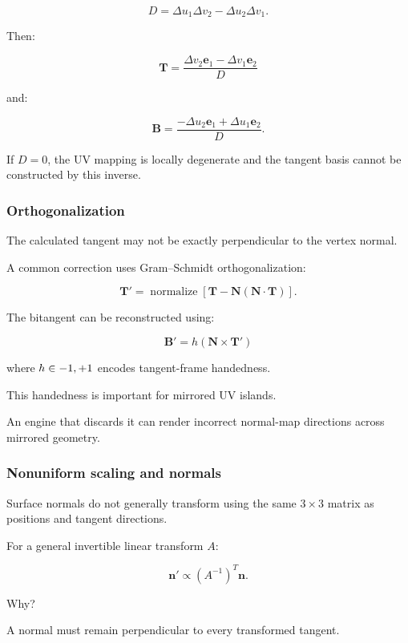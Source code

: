 \[
 D=\Delta u_1\Delta v_2-\Delta u_2\Delta v_1.
\]

Then:

\[
 \boxed{ \mathbf T= \frac{ \Delta v_2\mathbf e_1-\Delta v_1\mathbf e_2 }{D} }
\]

and:

\[
 \boxed{ \mathbf B= \frac{ -\Delta u_2\mathbf e_1+\Delta u_1\mathbf e_2 }{D} }.
\]

If \(D=0\), the UV mapping is locally degenerate and the tangent basis cannot be constructed by this inverse.

\subsubsection{Orthogonalization}\label{02-foundations-ii-ch032-orthogonalization}

The calculated tangent may not be exactly perpendicular to the vertex normal.

A common correction uses Gram--Schmidt orthogonalization:

\[
 \boxed{ \mathbf T'= \operatorname{normalize} \left[ \mathbf T-\mathbf N(\mathbf N\cdot\mathbf T) \right] }.
\]

The bitangent can be reconstructed using:

\[
 \boxed{ \mathbf B'=h(\mathbf N\times\mathbf T') }
\]

where \(h\in\\{-1,+1\\}\) encodes tangent-frame handedness.

This handedness is important for mirrored UV islands.

An engine that discards it can render incorrect normal-map directions across mirrored geometry.

\subsubsection{Nonuniform scaling and normals}\label{02-foundations-ii-ch032-nonuniform-scaling-and-normals}

Surface normals do not generally transform using the same \(3\times3\) matrix as positions and tangent directions.

For a general invertible linear transform \(A\):

\[
 \boxed{ \mathbf n'\propto(A^{-1})^T\mathbf n }.
\]

Why?

A normal must remain perpendicular to every transformed tangent.

